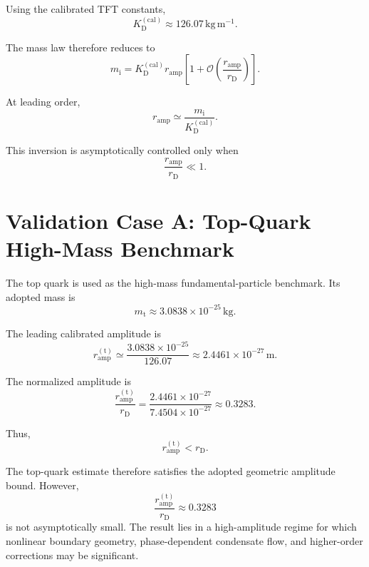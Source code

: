 Using the calibrated TFT constants,
\begin{equation}
    K_{\mathrm{D}}^{(\mathrm{cal})} \approx 126.07\,\mathrm{kg\,m^{-1}}.
\end{equation}

The mass law therefore reduces to
\begin{equation}
    m_{\mathrm{i}} = K_{\mathrm{D}}^{(\mathrm{cal})} r_{\mathrm{amp}} \left[ 1 + \mathcal{O} \left( \frac{r_{\mathrm{amp}}}{r_{\mathrm{D}}} \right) \right].
\end{equation}

At leading order,
\begin{equation}
    r_{\mathrm{amp}} \simeq \frac{m_{\mathrm{i}}}{K_{\mathrm{D}}^{(\mathrm{cal})}}.
\end{equation}

This inversion is asymptotically controlled only when
\begin{equation}
    \frac{r_{\mathrm{amp}}}{r_{\mathrm{D}}} \ll 1.
\end{equation}

\section{Validation Case A: Top-Quark High-Mass Benchmark}

The top quark is used as the high-mass fundamental-particle benchmark. Its adopted mass is
\begin{equation}
    m_{\mathrm{t}} \approx 3.0838\times10^{-25}\,\mathrm{kg}.
\end{equation}

The leading calibrated amplitude is
\begin{equation}
    r_{\mathrm{amp}}^{(\mathrm{t})} \simeq \frac{ 3.0838\times10^{-25} }{ 126.07 } \approx 2.4461\times10^{-27}\,\mathrm{m}.
\end{equation}

The normalized amplitude is
\begin{equation}
    \frac{ r_{\mathrm{amp}}^{(\mathrm{t})} }{ r_{\mathrm{D}} } = \frac{ 2.4461\times10^{-27} }{ 7.4504\times10^{-27} } \approx 0.3283.
\end{equation}

Thus,
\begin{equation}
    r_{\mathrm{amp}}^{(\mathrm{t})} < r_{\mathrm{D}}.
\end{equation}

The top-quark estimate therefore satisfies the adopted geometric amplitude bound. However,
\begin{equation}
    \frac{ r_{\mathrm{amp}}^{(\mathrm{t})} }{ r_{\mathrm{D}} } \approx 0.3283
\end{equation}
is not asymptotically small. The result lies in a high-amplitude regime for which nonlinear boundary geometry, phase-dependent condensate flow, and higher-order corrections may be significant.

